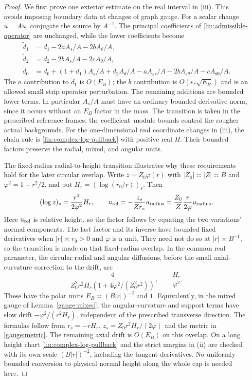\begin{proof}
We first prove one exterior estimate on the real interval in (iii).
This avoids imposing boundary data at changes of graph gauge.  For a
scalar change $u=A\widetilde u$, conjugate the source by $A^{-1}$.
The principal coefficients of \eqref{lin:admissible-operator} are
unchanged, while the lower coefficients become
\begin{align*}
 \widetilde d_1&=d_1-2aA_s/A-2bA_\theta/A,\\
 \widetilde d_2&=d_2-2bA_s/A-2cA_\theta/A,\\
 \widetilde d_0&=d_0+(1+d_1)A_s/A+d_2A_\theta/A
       -aA_{ss}/A-2bA_{s\theta}/A-cA_{\theta\theta}/A.
\end{align*}
The $a$ contribution to $\widetilde d_1$ is $O(E_B)$; the
$b$ contribution is $O(\varepsilon_*\sqrt{E_B})$ and is an allowed
small strip operator perturbation.  The remaining additions are bounded
lower terms.  In particular $A_s/A$ must have an ordinary bounded
derivative norm, since it occurs without an $E_B$ factor in the mass.
The transition is taken in the prescribed reference frames; the
coefficient--module bounds control the rougher actual backgrounds.
For the one-dimensional real coordinate changes in (iii), the chain
rule is \eqref{lin:complex-log-pullback} with positive real $H$.
Their bounded factors preserve the radial, mixed, and angular units.

The fixed-radius radial-to-height transition illustrates why these
requirements hold for the later circular overlap.  Write
$z=Z_0\varphi(r)$ with $|Z_0|\asymp|Z|\asymp B$ and
$\varphi^2=1-r^2/2$, and put
$H_r=(\log(r_0/r))_s$.  Then
\[
 (\log z)_s=\frac{r^2}{2\varphi^2}H_r,\qquad
 u_{\rm rel}
       =-\frac{z_s}{Zr_s}u_{\rm radius}
       =\frac{Z_0}{Z}\frac r{2\varphi}u_{\rm radius}.
\]
Here $u_{\rm rel}$ is relative height, so the factor follows by equating
the two variations' normal components.
The last factor and its inverse have bounded fixed derivatives when
$|r|\asymp r_0>0$ and $\varphi$ is a unit.  They need not do so at
$|r|\asymp B^{-1}$, so the transition is made on that fixed-radius
overlap.  In the common real parameter, the circular radial and angular
diffusions, before the small axial-curvature correction to the drift, are
\[
 \frac{4}{Z_0^2r^2H_r(1+4\varphi^2/(Z_0^2r^2))},
       \qquad \frac{H_r}{\varphi^2}.
\]
These have the polar units $E_B\asymp(B|r|)^{-2}$ and $1$.
Equivalently, in the mixed gauge of Lemma~\ref{gauge:mixed}, the
angular-curvature and support terms have slow drift
$-\varphi^2/(r^2H_r)$, independent of the prescribed transverse
direction.  The formulas follow from
$r_s=-rH_r$, $z_s=Z_0r^2H_r/(2\varphi)$ and the metric in
\eqref{gauge:metric}.  The remaining axial drift is $O(E_B)$ on this
overlap.  On a long height chart \eqref{lin:complex-log-pullback} and
the strict margins in (ii) are checked with its own scale
$(B|r|)^{-2}$, including the tangent derivatives.  No uniformly bounded
conversion to physical normal height along the whole cap is needed here.


\end{proof}
